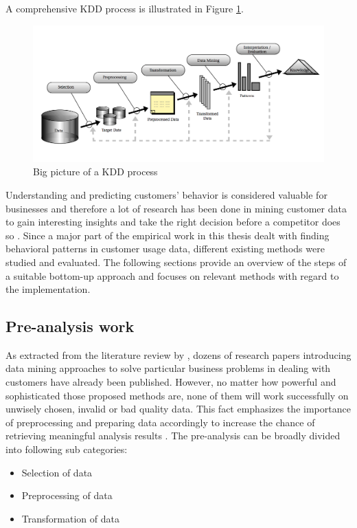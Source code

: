 A comprehensive KDD process is illustrated in Figure \ref{fig:kddProcess}.

\begin{figure}
	\centering
	\includegraphics[width=1.0\textwidth]{img/kdd.png}
	\caption{Big picture of a KDD process \cite{fayyad1996data}}
	\label{fig:kddProcess}
\end{figure} 

Understanding and predicting customers' behavior is considered valuable for businesses and therefore a lot of research has been done in mining customer data to gain interesting insights and take the right decision before a competitor does so \cite{Ngai2009}. Since a major part of the empirical work in this thesis dealt with finding behavioral patterns in customer usage data, different existing methods were studied and evaluated. The following sections provide an overview of the steps of a suitable bottom-up approach and focuses on relevant methods with regard to the implementation.

\subsection{Pre-analysis work}
As extracted from the literature review by \cite{Ngai2009}, dozens of research papers introducing data mining approaches to solve particular business problems in dealing with customers have already been published. However, no matter how powerful and sophisticated those proposed methods are, none of them will work successfully on unwisely chosen, invalid or bad quality data. This fact emphasizes the importance of preprocessing and preparing data accordingly to increase the chance of retrieving meaningful analysis results \cite{neckel2015} \cite{knobloch2000data}. The pre-analysis can be broadly divided into following sub categories:

\begin{itemize}
	\item Selection of data
	\item Preprocessing of data
	\item Transformation of data
\end{itemize}

